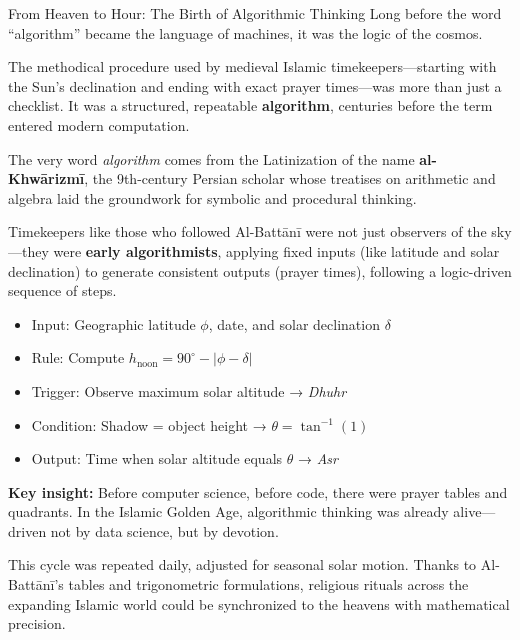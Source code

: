 \begin{HistoricalSidebar}{From Heaven to Hour: The Birth of Algorithmic Thinking}
    Long before the word “algorithm” became the language of machines, it was the logic of the cosmos.

    \medskip

    The methodical procedure used by medieval Islamic timekeepers—starting with the Sun’s declination and ending with exact prayer times—was more than just a checklist. It was a structured, repeatable \textbf{algorithm}, centuries before the term entered modern computation.

    \medskip

    The very word \textit{algorithm} comes from the Latinization of the name \textbf{al-Khwārizmī}, the 9th-century Persian scholar whose treatises on arithmetic and algebra laid the groundwork for symbolic and procedural thinking.

    \medskip

    Timekeepers like those who followed Al-Battānī were not just observers of the sky—they were \textbf{early algorithmists}, applying fixed inputs (like latitude and solar declination) to generate consistent outputs (prayer times), following a logic-driven sequence of steps.

    \medskip

    \begin{itemize}
        \item Input: Geographic latitude \( \phi \), date, and solar declination \( \delta \)
        \item Rule: Compute \( h_{\text{noon}} = 90^\circ - |\phi - \delta| \)
        \item Trigger: Observe maximum solar altitude → \textit{Dhuhr}
        \item Condition: Shadow = object height → \( \theta = \tan^{-1}(1) \)
        \item Output: Time when solar altitude equals \( \theta \) → \textit{Asr}
    \end{itemize}

    \medskip

    \textbf{Key insight:} Before computer science, before code, there were prayer tables and quadrants. In the Islamic Golden Age, algorithmic thinking was already alive—driven not by data science, but by devotion.
\end{HistoricalSidebar}


\medskip

This cycle was repeated daily, adjusted for seasonal solar motion. Thanks to Al-Battānī’s tables and trigonometric formulations, religious rituals across the expanding Islamic world could be synchronized to the heavens with mathematical precision.


